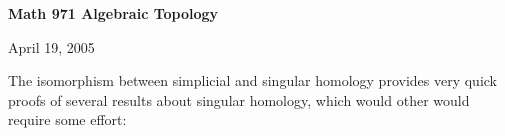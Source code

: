 \def\ccy{\Cyan}		  %
\def\cpb{\ProcessBlue}	  %
\def\csb{\SkyBlue}	  %
\def\ctu{\Turquoise}	  %
\def\ctb{\TealBlue}	  %
\def\caq{\Aquamarine}	  %
\def\cbg{\BlueGreen}	  %
\def\cem{\Emerald}	  %
\def\csg{\SeaGreen}	  %
\def\cgg{\Green}	  %
\def\cfg{\ForestGreen}	  %
\def\cpg{\PineGreen}	  %
\def\clg{\LimeGreen}	  %
\def\cyg{\YellowGreen}	  %
\def\cspg{\SpringGreen}	  %
\def\cog{\OliveGreen}	  %
\def\pars{\RawSienna}	  %
\def\cse{\Sepia}		  %
\def\cbr{\Brown}		  %
\def\cta{\Tan}		  %
\def\cgr{\Gray}		  %
\def\cbl{\Black}		  %
\def\cwh{\White}		  %


\loadmsbm



\def\ctln{\centerline}
\def\u{\underbar}
\def\ssk{\smallskip}
\def\msk{\medskip}
\def\bsk{\bigskip}
\def\hsk{\hskip.1in}
\def\hhsk{\hskip.2in}
\def\dsl{\displaystyle}
\def\hskp{\hskip1.5in}

\def\lra{$\Leftrightarrow$ }
\def\ra{\rightarrow}
\def\mpto{\logmapsto}
\def\pu{\pi_1}
\def\mpu{$\pi_1$}
\def\sig{\Sigma}
\def\msig{$\Sigma$}
\def\ep{\epsilon}
\def\sset{\subseteq}
\def\del{\partial}
\def\inv{^{-1}}
\def\wtl{\widetilde}
\def\lra{\Leftrightarrow}
\def\del{\partial}
\def\delp{\partial^\prime}
\def\delpp{\partial^{\prime\prime}}
\def\sgn{{\roman{sgn}}}
\def\wtih{\widetilde{H}}
\def\bbz{{\Bbb Z}}
\def\bbr{{\Bbb R}}



\ctln{\bf Math 971 Algebraic Topology}

\ssk

\ctln{April 19, 2005}

\msk




The isomorphism between simplicial and singular homology provides very quick proofs
of several results about singular homology, which would other would require some effort:

